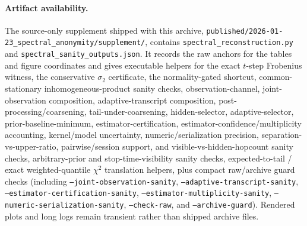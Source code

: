 \documentclass[11pt]{article}
\begin{document}
\paragraph{Artifact availability.}
The source-only supplement shipped with this archive,
\texttt{published/2026-01-23\_spectral\_anonymity/supplement/}, contains
\texttt{spectral\_reconstruction.py} and
\texttt{spectral\_sanity\_outputs.json}.  It records the raw anchors for the
tables and figure coordinates and gives executable helpers for the exact
$t$-step Frobenius witness, the conservative $\sigma_2$ certificate, the
normality-gated shortcut, common-stationary inhomogeneous-product sanity checks,
observation-channel, joint-observation composition, adaptive-transcript composition, post-processing/coarsening, tail-under-coarsening, hidden-selector, adaptive-selector, prior-baseline-minimum, estimator-certification, estimator-confidence/multiplicity accounting, kernel/model uncertainty, numeric/serialization precision, separation-vs-upper-ratio, pairwise/session support, and visible-vs-hidden-hopcount sanity checks, arbitrary-prior
and stop-time-visibility sanity checks, expected-to-tail / exact weighted-quantile
$\chi^2$ translation helpers, plus compact raw/archive guard
checks (including \texttt{--joint-observation-sanity}, \texttt{--adaptive-transcript-sanity}, \texttt{--estimator-certification-sanity}, \texttt{--estimator-multiplicity-sanity}, \texttt{--numeric-serialization-sanity}, \texttt{--check-raw}, and \texttt{--archive-guard}). Rendered plots and long
logs remain transient rather than shipped archive files.
\end{document}

